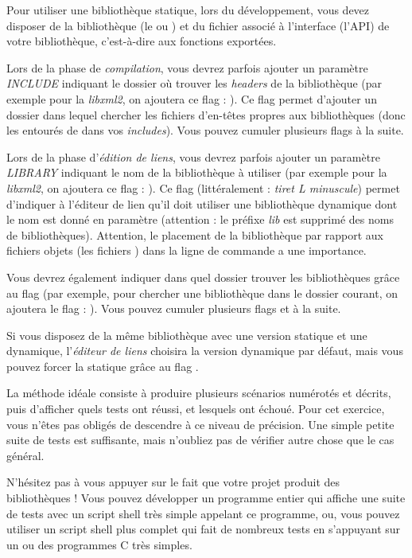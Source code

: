 \bigskip

Pour utiliser une bibliothèque statique, lors du développement, vous devez disposer de la bibliothèque (le  ou ) et du fichier  associé à l'interface (l'API) de votre bibliothèque, c'est-à-dire aux fonctions exportées.

\medskip

Lors de la phase de \textit{compilation}, vous devrez parfois ajouter un paramètre \textit{INCLUDE} indiquant le dossier où trouver les \textit{headers} de la bibliothèque (par exemple pour la \textit{libxml2}, on ajoutera ce flag : ).
Ce flag  permet d'ajouter un dossier dans lequel chercher les fichiers d'en-têtes propres aux bibliothèques (donc les  entourés de \TTBF{<  >} dans vos \textit{includes}).
Vous pouvez cumuler plusieurs flags  à la suite.

\medskip

Lors de la phase d'\textit{édition de liens}, vous devrez parfois ajouter un paramètre \textit{LIBRARY} indiquant le nom de la bibliothèque à utiliser (par exemple pour la \textit{libxml2}, on ajoutera ce flag : ).
Ce flag  (littéralement : \textit{tiret L minuscule}) permet d'indiquer à l'éditeur de lien qu'il doit utiliser une bibliothèque dynamique dont le nom est donné en paramètre (attention : le préfixe \textit{lib} est supprimé des noms de bibliothèques).
Attention, le placement de la bibliothèque par rapport aux fichiers objets (les fichiers ) dans la ligne de commande a une importance.

\medskip

Vous devrez également indiquer dans quel dossier trouver les bibliothèques grâce au flag  (par exemple, pour chercher une bibliothèque dans le dossier courant, on ajoutera le flag : ).
Vous pouvez cumuler plusieurs flags  et  à la suite.

\medskip

Si vous disposez de la même bibliothèque avec une version statique et une dynamique, l'\textit{éditeur de liens} choisira la version dynamique par défaut, mais vous pouvez forcer la statique grâce au flag .

\bigskip

\noindent La méthode idéale consiste à produire plusieurs scénarios numérotés et décrits, puis d'afficher quels tests ont réussi, et lesquels ont échoué.
Pour cet exercice, vous n'êtes pas obligés de descendre à ce niveau de précision.
Une simple petite suite de tests est suffisante, mais n'oubliez pas de vérifier autre chose que le cas général.

N'hésitez pas à vous appuyer sur le fait que votre projet produit des bibliothèques !
Vous pouvez développer un programme entier qui affiche une suite de tests avec un script shell très simple appelant ce programme, ou, vous pouvez utiliser un script shell plus complet qui fait de nombreux tests en s'appuyant sur un ou des programmes C très simples.
